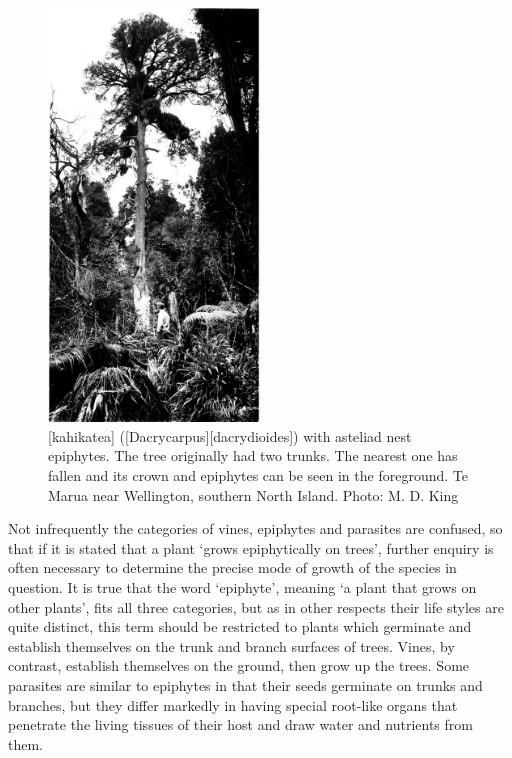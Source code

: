 \begin{figure}
	\centering
	\includegraphics[width=0.5\textwidth]{graphics/figure26kahikatea.jpg}
	\caption[Kahikatea with asteliad nest epiphytes]{[kahikatea] ([Dacrycarpus][dacrydioides]) with asteliad nest epiphytes.
	The tree originally had two trunks.
	The nearest one has fallen and its crown and epiphytes can be seen in the foreground.
	Te Marua near Wellington, southern North Island.
	Photo: M. D. King}%
	\label{fig:26kahikatea}
\end{figure}

Not infrequently the categories of vines, epiphytes and parasites are confused, so that if it is stated that a plant `grows epiphytically on trees', further enquiry is often necessary to determine the precise mode of growth of the species in question.
It is true that the word `epiphyte', meaning `a plant that grows on other plants', fits all three categories, but as in other respects their life styles are quite distinct, this term should be restricted to plants which germinate and establish themselves on the trunk and branch surfaces of trees.
Vines, by contrast, establish themselves on the ground, then grow up the trees.
Some parasites are similar to epiphytes in that their seeds germinate on trunks and branches, but they differ markedly in having special root-like organs that penetrate the living tissues of their host and draw water and nutrients from them.

